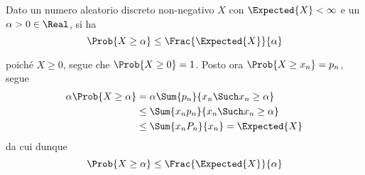 \documentclass{subfiles}
\begin{document}
\begin{Theorem}
    Dato un numero aleatorio discreto non-negativo $X$ con $\Expected{X} < \infty$ e un $\alpha > 0 \in \Real$, si ha
    $$
        \Prob{X \ge \alpha} \le \Frac{\Expected{X}}{\alpha}
    $$
    \begin{Proof*}
        poiché $X \ge 0$, segue che $\Prob{X \ge 0} = 1$. Posto ora $\Prob{X \ge x_{n}} = p_{n}$, segue
        $$\begin{aligned}
                \alpha \Prob{X \ge \alpha} & = \alpha \Sum{p_{n}}{x_{n} \Such x_{n} \ge \alpha} \\
                                           & \le \Sum{x_{n}p_{n}}{x_{n} \Such x_{n} \ge \alpha} \\
                                           & \le \Sum{x_{n} P_{n}}{x_{n}} = \Expected{X}
            \end{aligned}$$
        da cui dunque
        $$
            \Prob{X \ge \alpha} \le \Frac{\Expected{X}}{\alpha}
        $$
    \end{Proof*}
\end{Theorem}
\end{document}
